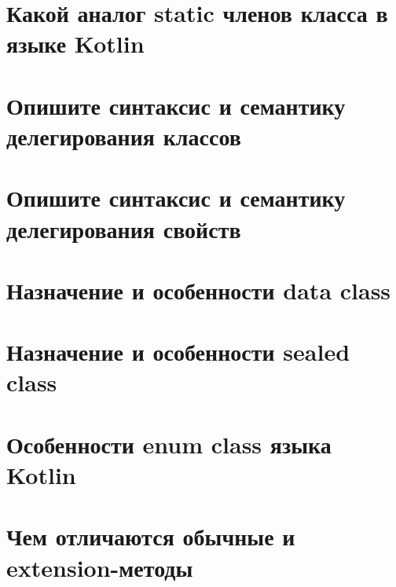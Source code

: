 \documentclass[12pt]{article}
\begin{document}
\section*{Какой аналог static членов класса в языке Kotlin}
\begin{enumerate}[leftmargin=*]
\end{enumerate}
\vspace{2mm}
\section*{Опишите синтаксис и семантику делегирования классов}
\begin{enumerate}[leftmargin=*]
\end{enumerate}
\vspace{2mm}
\section*{Опишите синтаксис и семантику делегирования свойств}
\begin{enumerate}[leftmargin=*]
\end{enumerate}
\vspace{2mm}
\section*{Назначение и особенности data class}
\begin{enumerate}[leftmargin=*]
\end{enumerate}
\vspace{2mm}
\section*{Назначение и особенности sealed class}
\begin{enumerate}[leftmargin=*]
\end{enumerate}
\vspace{2mm}
\section*{Особенности enum class языка Kotlin}
\begin{enumerate}[leftmargin=*]
\end{enumerate}
\vspace{2mm}
\section*{Чем отличаются обычные и extension-методы}
\begin{enumerate}[leftmargin=*]
\end{enumerate}
\vspace{2mm}
\end{document}
